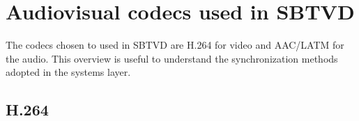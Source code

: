 \documentclass[
	12pt,				%
	openright,			%
	twoside,			%
	a4paper,			%
	brazil,
	french,				%
	english
	]{abntex2}
\begin{document}




%



\chapter{Audiovisual codecs used in SBTVD}
\label{codecs}

The codecs chosen to used in SBTVD are H.264 for video and AAC/LATM for the audio. This overview is useful to understand the synchronization methods adopted in the systems layer.

\section{H.264}
\end{document}
